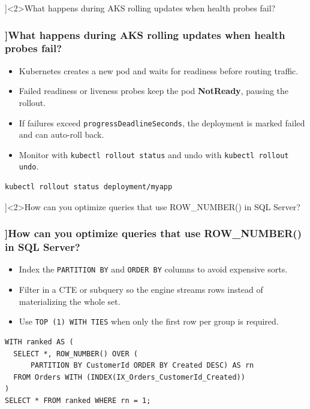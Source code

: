 \QuestionSlide[\CategoryBadge[AuthColor!20]{Cloud}]<2>{What happens during AKS rolling updates when health probes fail?}
\begin{frame}[fragile]
  \frametitle{\AnswerTitle[\CategoryBadge[AuthColor!20]{Cloud}]{What happens during AKS rolling updates when health probes fail?}}

  {\footnotesize
  \begin{itemize}
    \item Kubernetes creates a new pod and waits for readiness before routing traffic.
    \item Failed readiness or liveness probes keep the pod \textbf{NotReady}, pausing the rollout.
    \item If failures exceed \texttt{progressDeadlineSeconds}, the deployment is marked failed and can auto-roll back.
    \item Monitor with \texttt{kubectl rollout status} and undo with \texttt{kubectl rollout undo}.
  \end{itemize}
  }

  \begin{verbatim}
kubectl rollout status deployment/myapp
  \end{verbatim}
\end{frame}

\QuestionSlide[\CategoryBadge[AuthColor!20]{Cloud}]<2>{How can you optimize queries that use ROW\_NUMBER() in SQL Server?}
\begin{frame}[fragile]
  \frametitle{\AnswerTitle[\CategoryBadge[AuthColor!20]{Cloud}]{How can you optimize queries that use ROW\_NUMBER() in SQL Server?}}

  {\footnotesize
  \begin{itemize}
    \item Index the \texttt{PARTITION BY} and \texttt{ORDER BY} columns to avoid expensive sorts.
    \item Filter in a CTE or subquery so the engine streams rows instead of materializing the whole set.
    \item Use \texttt{TOP (1) WITH TIES} when only the first row per group is required.
  \end{itemize}
  }

  \begin{verbatim}
WITH ranked AS (
  SELECT *, ROW_NUMBER() OVER (
      PARTITION BY CustomerId ORDER BY Created DESC) AS rn
  FROM Orders WITH (INDEX(IX_Orders_CustomerId_Created))
)
SELECT * FROM ranked WHERE rn = 1;
  \end{verbatim}
\end{frame}

